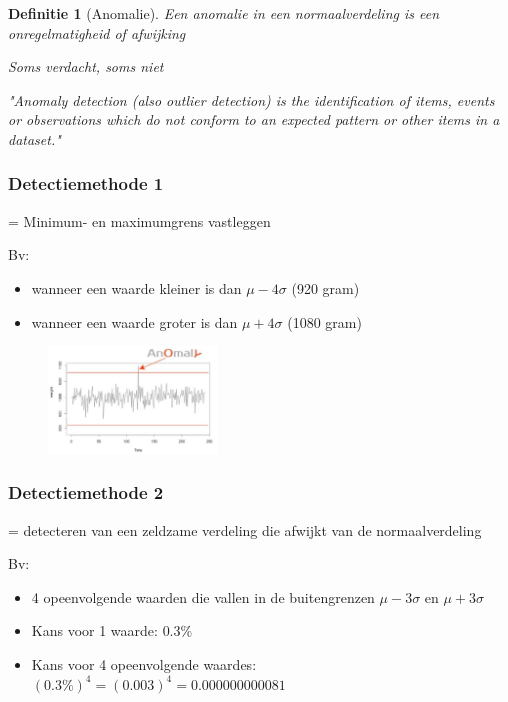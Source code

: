 \documentclass{article}
\newtheorem{theorem}{Definitie}[section]
\begin{document}
\begin{theorem}[Anomalie]
    Een anomalie in een normaalverdeling is een onregelmatigheid of afwijking

    Soms verdacht, soms niet

    "Anomaly detection (also outlier detection) is the identification of items,
    events or observations which do not conform to an expected pattern or
    other items in a dataset."
\end{theorem}

\subsubsection{Detectiemethode 1}

= Minimum- en maximumgrens vastleggen

Bv:

\begin{itemize}
    \item wanneer een waarde kleiner is dan $\mu - 4\sigma$ (920 gram)
    \item wanneer een waarde groter is dan $\mu + 4\sigma$ (1080 gram)
\end{itemize}

\begin{figure}[H]
    \centering
    \includegraphics[width=0.4\textwidth]{anomaly-detection2.png}
\end{figure}

\subsubsection{Detectiemethode 2}

= detecteren van een zeldzame verdeling die afwijkt van de normaalverdeling

Bv:

\begin{itemize}
    \item 4 opeenvolgende waarden die vallen in de buitengrenzen $\mu - 3\sigma$ en $\mu + 3\sigma$
    \item Kans voor 1 waarde: $0.3\%$
    \item Kans voor 4 opeenvolgende waardes: $(0.3\%)^4 = (0.003)^4 = 0.000000000081$
\end{itemize}
\end{document}
